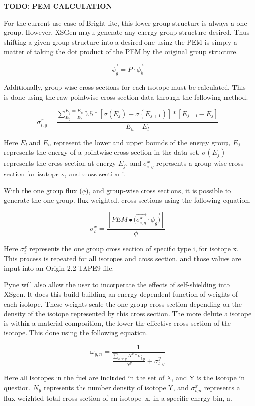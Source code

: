 \documentclass{article}
\newcommand{\TODO}[1] {{\color{red}\textbf{TODO: #1}}}
\begin{document}
\TODO{PEM CALCULATION}

For the current use case of Bright-lite, this lower group structure is always a one group.
However, XSGen mayu generate any energy group structure desired.
Thus shifting a given group structure into a desired one using the PEM is simply a matter
of taking the dot product of the PEM by the original group structure.

\[ \vec{\phi_g} = P \cdot \vec{\phi_h} \]

Additionally, group-wise cross sections for each isotope must be calculated. This is done using the raw pointwise cross section data through the following method.

$$\sigma_{i,g}^x = \frac{\sum_{E_j=E_l}^{E_j=E_u}0.5*[\sigma(E_j)+\sigma(E_{j+1})]*[E_{j+1}-E_{j}]}{E_u-E_l}$$

Here $E_l$ and $E_u$ represent the lower and upper bounds of the energy group, $E_j$ represents the energy of a pointwise cross section in the data set, $\sigma(E_j)$ represents the cross section at energy $E_j$, and $\sigma_{i,g}^x$ represents a group wise cross section for isotope x, and cross section i.

With the one group flux ($\phi$), and group-wise cross sections, it is possible to generate the one group, flux weighted, cross sections using the following equation.

$$\sigma_{i}^x=\frac{[PEM∙(\vec{\sigma_{i,g}^x} \cdot \vec{\phi_g)}]}{\phi}$$

Here $\sigma_{i}^x$ represents the one group cross section of specific type i, for isotope x. This process is repeated for all isotopes and cross section, and those values are input into an Origin 2.2 TAPE9 file.

Pyne will also allow the user to incorperate the effects of self-shielding into XSgen. It does this build building an energy dependent function of weights of each isotope. These weights scale the one group cross section depending on the density of the isotope represented by this cross section. The more delute a isotope is within a material composition, the lower the effective cross section of the isotope. This done using the following equation.

$$\omega_{y,n}=\frac{1}{\frac{\sum_{x\neq y}N^x * \sigma_{t,g}^x}{N^y}+\sigma_{t,g}^y}$$

Here all isotopes in the fuel are included in the set of X, and Y is the isotope in question. $N_y$ represents the number density of isotope Y, and $\sigma_{t,n}^x$ represents a flux weighted total cross section of an isotope, x, in a specific energy bin, n.
\end{document}
